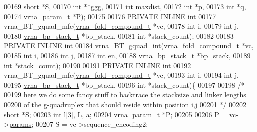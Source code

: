 \begin{DoxyCode}
00169                                               \textcolor{keywordtype}{short} *S,
00170                                               \textcolor{keywordtype}{int} **ggg,
00171                                               \textcolor{keywordtype}{int} maxdist,
00172                                               \textcolor{keywordtype}{int} *p,
00173                                               \textcolor{keywordtype}{int} *q,
00174                                               \hyperlink{group__energy__parameters_structvrna__param__s}{vrna\_param\_t} *P);
00175 
00176 PRIVATE INLINE \textcolor{keywordtype}{int}
00177 vrna\_BT\_gquad\_mfe(\hyperlink{group__fold__compound_structvrna__fc__s}{vrna\_fold\_compound\_t} *vc,
00178                   \textcolor{keywordtype}{int} i,
00179                   \textcolor{keywordtype}{int} j,
00180                   \hyperlink{group__data__structures_structvrna__bp__stack__s}{vrna\_bp\_stack\_t} *bp\_stack,
00181                   \textcolor{keywordtype}{int} *stack\_count);
00182 
00183 PRIVATE INLINE \textcolor{keywordtype}{int}
00184 vrna\_BT\_gquad\_int(\hyperlink{group__fold__compound_structvrna__fc__s}{vrna\_fold\_compound\_t} *vc,
00185                   \textcolor{keywordtype}{int} i,
00186                   \textcolor{keywordtype}{int} j,
00187                   \textcolor{keywordtype}{int} en,
00188                   \hyperlink{group__data__structures_structvrna__bp__stack__s}{vrna\_bp\_stack\_t} *bp\_stack,
00189                   \textcolor{keywordtype}{int} *stack\_count);
00190 
00191 PRIVATE INLINE \textcolor{keywordtype}{int}
00192 vrna\_BT\_gquad\_mfe(\hyperlink{group__fold__compound_structvrna__fc__s}{vrna\_fold\_compound\_t} *vc,
00193                   \textcolor{keywordtype}{int} i,
00194                   \textcolor{keywordtype}{int} j,
00195                   \hyperlink{group__data__structures_structvrna__bp__stack__s}{vrna\_bp\_stack\_t} *bp\_stack,
00196                   \textcolor{keywordtype}{int} *stack\_count)\{
00197 
00198   \textcolor{comment}{/*}
00199 \textcolor{comment}{    here we do some fancy stuff to backtrace the stacksize and linker lengths}
00200 \textcolor{comment}{    of the g-quadruplex that should reside within position i,j}
00201 \textcolor{comment}{  */}
00202   \textcolor{keywordtype}{short}         *S;
00203   \textcolor{keywordtype}{int}           l[3], L, a;
00204   \hyperlink{group__energy__parameters_structvrna__param__s}{vrna\_param\_t}  *P;
00205 
00206   P = vc->\hyperlink{group__fold__compound_a19b8720c2c5321c1b97c830bd17566ea}{params};
00207   S = vc->sequence\_encoding2;

\end{DoxyCode}
